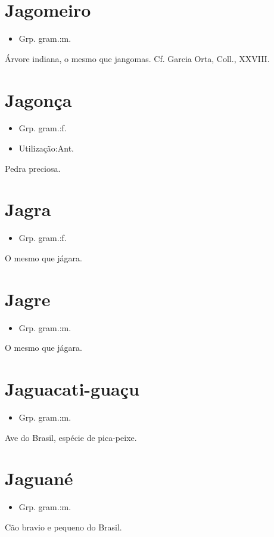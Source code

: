 \documentclass{article}
\begin{document}
\section{Jagomeiro}
\begin{itemize}
\item {Grp. gram.:m.}
\end{itemize}
Árvore indiana, o mesmo que \textunderscore jangomas\textunderscore . Cf. Garcia Orta, \textunderscore Coll.\textunderscore , XXVIII.
\section{Jagonça}
\begin{itemize}
\item {Grp. gram.:f.}
\end{itemize}
\begin{itemize}
\item {Utilização:Ant.}
\end{itemize}
Pedra preciosa.
\section{Jagra}
\begin{itemize}
\item {Grp. gram.:f.}
\end{itemize}
O mesmo que \textunderscore jágara\textunderscore .
\section{Jagre}
\begin{itemize}
\item {Grp. gram.:m.}
\end{itemize}
O mesmo que \textunderscore jágara\textunderscore .
\section{Jaguacati-guaçu}
\begin{itemize}
\item {Grp. gram.:m.}
\end{itemize}
Ave do Brasil, espécie de pica-peixe.
\section{Jaguané}
\begin{itemize}
\item {Grp. gram.:m.}
\end{itemize}
Cão bravio e pequeno do Brasil.
\end{document}
